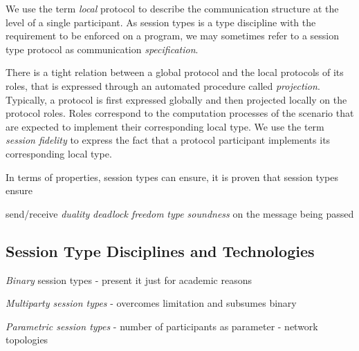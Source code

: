 We use the term {\em local} protocol to describe
the communication structure at the level of a single participant.
As session types is a type discipline with the requirement to
be enforced on a program, we may sometimes refer to a session type
protocol as communication {\em specification}.

\begin{comment}
For example Scribble code:
%
\begin{lstlisting}
  msg(int) from A to B;
\end{lstlisting}
%
describes the global protocol between role \lstinline|A| and \lstinline|B|,
where participant \lstinline|A| sends message of type \lstinline|msg(int)|
to participant \lstinline|B|. From the local perspective of participant
\lstinline|A| the protocol would be:
%
\begin{lstlisting}
  msg(int) to B;
\end{lstlisting}
%
where it describes the sending of message \lstinline|msg(int)|
to participant \lstinline|B|.
\end{comment}

There is a tight relation between a global protocol and the
local protocols of its roles, that is expressed
through an automated procedure called {\em projection}.
Typically, a protocol is first expressed globally and then
projected locally on the protocol roles. Roles
correspond to the computation processes of the scenario
that are expected to implement their corresponding local type.
We use the term {\em session fidelity} to express the fact
that a protocol participant implements its corresponding local type.

In terms of properties, session types can ensure, it is proven
that session types ensure

send/receive {\em duality}
{\em deadlock freedom}
{\em type soundness} on the message being passed


\subsection{Session Type Disciplines and Technologies}


{\em Binary} session types - present it just for academic reasons

{\em Multiparty session types} - overcomes limitation and subsumes binary

{\em Parametric session types} - number of participants as parameter - network topologies

